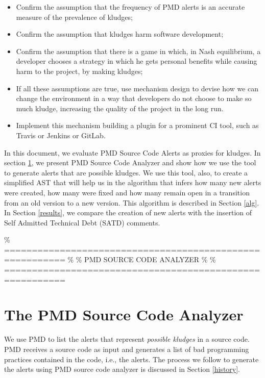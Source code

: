 \documentclass[
]{article}
\begin{document}
\begin{itemize}
\item
  Confirm the assumption that the frequency of PMD alerts is an accurate
  measure of the prevalence of kludges;
  
\item
  Confirm the assumption that kludges harm software development;

\item
  Confirm the assumption that there is a game in which, in Nash
  equilibrium, a developer chooses a strategy in which he gets personal
  benefits while causing harm to the project, by making kludges;

\item
  If all these assumptions are true, use mechanism design to devise how
  we can change the environment in a way that developers do not choose
  to make so much kludge, increasing the quality of the project in the
  long run.

\item
  Implement this mechanism building a plugin for a prominent CI tool,
  such as Travis or Jenkins or GitLab.
\end{itemize}

In this document, we evaluate PMD Source Code Alerts as proxies for
kludges. In section \ref{pmd}, we present PMD Source Code Analyzer and
show how we use the tool to generate alerts that are possible kludges.
We use this tool, also, to create a simplified AST that will help us in
the algorithm that infers how many new alerts were created, how many
were fixed and how many remain open in a transition from an old version
to a new version. This algorithm is described in Section \ref{alg}. In
Section \ref{results}, we compare the creation of new alerts with the
insertion of Self Admitted Technical Debt (SATD) comments.

\% ========================================================= \% \% PMD
SOURCE CODE ANALYZER \% \%
=========================================================

\section{The PMD Source Code Analyzer}\label{pmd}

We use PMD to list the alerts that represent \textit{possible kludges}
in a source code. PMD receives a source code as input and generates a
list of bad programming practices contained in the code, i.e., the
alerts. The process we follow to generate the alerts using PMD source
code analyzer is discussed in Section \ref{history}.
\end{document}
